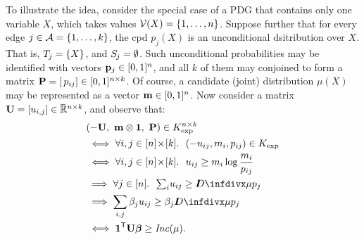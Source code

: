 \documentclass[twoside]{article}
\begin{document}
To illustrate the idea, consider the special case of a PDG that
contains only one variable $X$, which takes values $\mathcal V(X) = \{1, \ldots, n\}$. 
Suppose further that for every edge $j \in \mathcal A = \{1, \ldots, k\}$, the cpd $p_j(X)$ is an unconditional dsitribution over $X$.
That is, $\Tgt j = \{ X \}$, and $\Src j = \emptyset$.
Such unconditional probabilities may be identified with vectors $\mathbf{p}_j \in [0,1]^n$, and all $k$ of them may conjoined to form a 
matrix $\mathbf{P} = [\,p_{ij}] \in [0,1]^{n \times k}$.
Of course, a candidate (joint) distribution $\mu(X)$
may be represented as a vector $\mathbf{m} \in [0,1]^n$. 
%
Now consider a matrix $\mathbf{U} = [u_{i,j}] \in \mskip1mu\overline{\mskip-1mu\mathbb R\!}\,^{n \times k}$,
and observe that:
\begin{align*}
    &(- \mat U,~ \mat m \otimes \mat 1,~ \mat P) \in K_{\exp}^{n \times k} \\
    &\iff \forall  i,j \in [n]\!\times\![k].~~ 
        (- u_{ij}, m_{i}, p_{ij}) \in K_{\exp} \\
    &\iff \forall  i,j \in [n]\!\times\![k].~~ 
            u_{ij} \ge m_i \log \frac{m_i}{p_{ij}} \\
    &\implies \forall j \in [n].~~  {\textstyle\sum_i} u_{ij}  \ge \kldiv{\mu}{p_j} \\
    &\implies \sum_{i,j} \beta_j u_{ij}  \ge \beta_j \kldiv{\mu}{p_j} \\
    &\iff \mat 1^{\sf T} \mat U \bbeta \ge \Inc(\mu)
    .
\end{align*}
\end{document}
